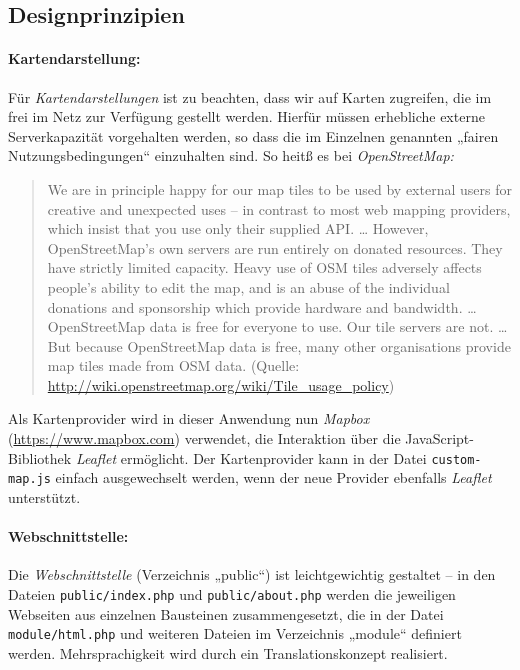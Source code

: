\documentclass[11pt,a4paper]{article}
\begin{document}
\subsection{Designprinzipien}

\paragraph{Kartendarstellung:}
Für \emph{Kartendarstellungen} ist zu beachten, dass wir auf Karten zugreifen,
die im frei im Netz zur Verfügung gestellt werden.  Hierfür müssen erhebliche
externe Serverkapazität vorgehalten werden, so dass die im Einzelnen genannten
„fairen Nutzungsbedingungen“ einzuhalten sind. So heitß es bei
\emph{OpenStreetMap:}
\begin{quote}
  We are in principle happy for our map tiles to be used by external users for
  creative and unexpected uses – in contrast to most web mapping providers,
  which insist that you use only their supplied API. {\ldots} However,
  OpenStreetMap's own servers are run entirely on donated resources. They have
  strictly limited capacity. Heavy use of OSM tiles adversely affects people's
  ability to edit the map, and is an abuse of the individual donations and
  sponsorship which provide hardware and bandwidth. {\ldots} OpenStreetMap data
  is free for everyone to use. Our tile servers are not.  {\ldots} But because
  OpenStreetMap data is free, many other organisations provide map tiles made
  from OSM data. (Quelle:
  \url{http://wiki.openstreetmap.org/wiki/Tile_usage_policy})
\end{quote}

Als Kartenprovider wird in dieser Anwendung nun \emph{Mapbox}
(\url{https://www.mapbox.com}) verwendet, die Interaktion über die
JavaScript-Bibliothek \emph{Leaflet} ermöglicht.  Der Kartenprovider kann in
der Datei \texttt{custom-map.js} einfach ausgewechselt werden, wenn der neue
Provider ebenfalls \emph{Leaflet} unterstützt. 

\paragraph{Webschnittstelle:}
Die \emph{Webschnittstelle} (Verzeichnis „public“) ist leichtgewichtig
gestaltet -- in den Dateien \texttt{public/index.php} und
\texttt{public/about.php} werden die jeweiligen Webseiten aus einzelnen
Bausteinen zusammengesetzt, die in der Datei \texttt{module/html.php} und
weiteren Dateien im Verzeichnis „module“ definiert werden.  Mehrsprachigkeit
wird durch ein Translationskonzept realisiert.
\end{document}
